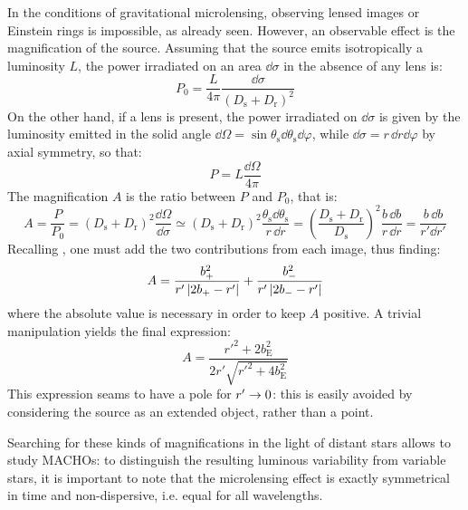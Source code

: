 In the conditions of gravitational microlensing, observing lensed images or Einstein rings is impossible, as already seen. However, an observable effect is the magnification of the source. Assuming that the source emits isotropically a luminosity $ L $, the power irradiated on an area $ \dd \sigma $ in the absence of any lens is:
\begin{equation*}
  P_0 = \frac{L}{4\pi} \frac{\dd \sigma}{(D_\text{s} + D_\text{r})^2}
\end{equation*}
On the other hand, if a lens is present, the power irradiated on $ \dd \sigma $ is given by the luminosity emitted in the solid angle $ \dd \Omega = \sin \theta_\text{s} \dd \theta_\text{s} \dd \varphi $, while $ \dd \sigma = r \, \dd r \dd \varphi $ by axial symmetry, so that:
\begin{equation*}
  P = L \frac{\dd \Omega}{4\pi}
\end{equation*}
The magnification $ A $ is the ratio between $ P $ and $ P_0 $, that is:
\begin{equation*}
  A = \frac{P}{P_0} = (D_\text{s} + D_\text{r})^2 \frac{\dd \Omega}{\dd \sigma} \simeq (D_\text{s} + D_\text{r})^2 \frac{\theta_\text{s} \dd \theta_\text{s}}{r \, \dd r} = \left( \frac{D_\text{s} + D_\text{r}}{D_\text{s}} \right)^2 \frac{b \, \dd b}{r \, \dd r} = \frac{b \, \dd b}{r' \dd r'}
\end{equation*}
Recalling , one must add the two contributions from each image, thus finding:
\begin{equation*}
  A = \frac{b_+^2}{r' \left\lvert2b_+ - r'\right\rvert} + \frac{b_-^2}{r' \left\lvert2b_- - r'\right\rvert}
\end{equation*}
where the absolute value is necessary in order to keep $ A $ positive. A trivial manipulation yields the final expression:
\begin{equation}
  A = \frac{r'^2 + 2 b_\text{E}^2}{2 r' \sqrt{r'^2 + 4 b_\text{E}^2}}
\end{equation}
This expression seams to have a pole for $ r' \rightarrow 0 $: this is easily avoided by considering the source as an extended object, rather than a point.

Searching for these kinds of magnifications in the light of distant stars allows to study MACHOs: to distinguish the resulting luminous variability from variable stars, it is important to note that the microlensing effect is exactly symmetrical in time and non-dispersive, i.e. equal for all wavelengths.










